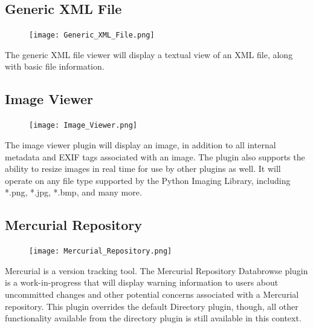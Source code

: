 \documentclass[10pt]{article}
\begin{document}
\begingroup
\setlength\intextsep{0pt}
\subsection{Generic XML File}
\begin{figure}
		\texttt{[image: Generic\_XML\_File.png]}
\end{figure}
The generic XML file viewer will display a textual view of an XML file, along with basic file information.

\endgroup

\clearpage
\begingroup
\setlength\intextsep{0pt}
\subsection{Image Viewer}
\begin{figure}
		\texttt{[image: Image\_Viewer.png]}
\end{figure}
The image viewer plugin will display an image, in addition to all internal metadata and EXIF tags associated with an image.  The plugin also supports the ability to resize images in real time for use by other plugins as well.  It will operate on any file type supported by the Python Imaging Library, including *.png, *.jpg, *.bmp, and many more.

\endgroup

\hfill \break
\hfill \break
\hfill \break
\hfill \break
\hfill \break
\hfill \break
\hfill \break

\begingroup
\setlength\intextsep{0pt}
\subsection{Mercurial Repository}
\begin{figure}
		\texttt{[image: Mercurial\_Repository.png]}
\end{figure}
Mercurial is a version tracking tool.  The Mercurial Repository Databrowse plugin is a work-in-progress that will display warning information to users about uncommitted changes and other potential concerns associated with a Mercurial repository.  This plugin overrides the default Directory plugin, though, all other functionality available from the directory plugin is still available in this context.

\endgroup

\hfill \break

\begingroup
\setlength\intextsep{0pt}
\end{document}
